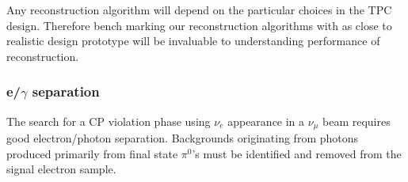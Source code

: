 Any reconstruction algorithm will depend on the particular choices in the TPC design. 
Therefore bench marking our reconstruction algorithms with as close to realistic design prototype will
be invaluable to understanding performance of reconstruction.

%


\subsubsection{e/$\gamma$ separation}

The search for a CP violation phase using $\nu_e$ appearance 
in a $\nu_\mu$ beam requires good electron/photon separation.
Backgrounds originating from photons produced primarily from 
final state $\pi^0$'s must be identified and removed from the signal
electron sample. 


